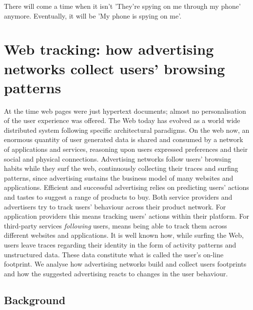 \begin{savequote}[75mm] 
There will come a time when it isn't 'They're spying on me through my phone' anymore. Eventually, it will be 'My phone is spying on me'.
\end{savequote}

\chapter{Web tracking: how advertising networks collect users' browsing patterns}

 At the time web pages were just hypertext documents; almost no personalisation of the user experience was offered. The Web today has evolved as a world wide distributed system following specific architectural paradigms. On the web now, an enormous quantity of user generated data is shared and consumed by a network of applications and services, reasoning upon users expressed preferences and their social and physical connections. Advertising networks follow users' browsing habits while they surf the web, continuously collecting their traces and surfing patterns, since advertising sustains the business model of many websites and applications. Efficient and successful advertising relies on predicting users' actions and tastes to suggest a range of products to buy. Both service providers and advertisers try to track users' behaviour across their product network. For application providers this means tracking users' actions within their platform. For third-party services \emph{following} users, means being able to track them across different websites and applications. It is well known how, while surfing the Web, users leave traces regarding their identity in the form of activity patterns and unstructured data. These data constitute what is called the user's on-line footprint. We analyse how advertising networks build and collect users footprints and how the suggested advertising reacts to changes in the user behaviour.

\section{Background}

